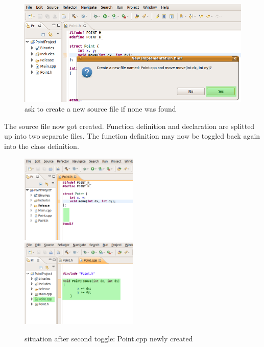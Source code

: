 \begin{figure}[h]
\includegraphics[width=\textwidth]{images/step3a.png}
\caption{ask to create a new source file if none was found}
\label{exampleB}
\end{figure}

The source file now got created. Function definition and declaration are 
splitted up into two separate files. The function definition may now be toggled 
back again into the class definition.

\begin{figure}[h]
\includegraphics[width=0.5\textwidth]{images/step3b.png}
\includegraphics[width=0.5\textwidth]{images/step3c.png}
\caption{situation after second toggle: Point.cpp newly created}
\label{exampleC}
\end{figure}


